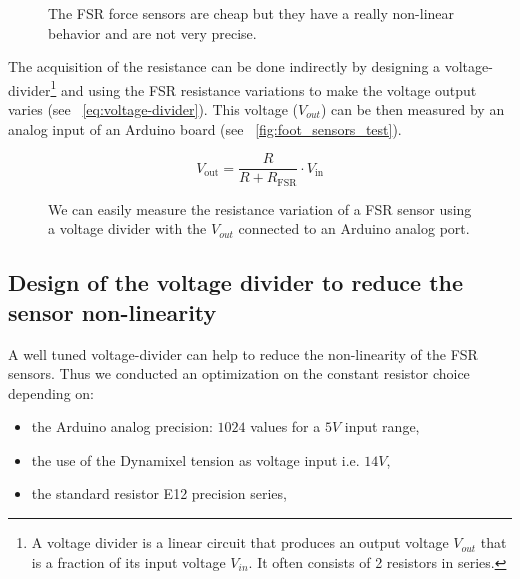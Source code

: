 \begin{figure}[h]
\centering
    \hfil
    \caption{The FSR force sensors are cheap but they have a really non-linear behavior and are not very precise.}
    \label{fig:}
\end{figure}

The acquisition of the resistance can be done indirectly by designing a voltage-divider\footnote{A voltage divider is a linear circuit that produces an output voltage $V_{out}$ that is a fraction of its input voltage $V_{in}$. It often consists of 2 resistors in series.} and using the FSR resistance variations to make the voltage output varies (see \equationname~\ref{eq:voltage-divider}). This voltage ($V_{out}$) can be then measured by an analog input of an Arduino board (see \figurename~\ref{fig:foot_sensors_test}).

\begin{equation}
    V_\mathrm{out} = \frac{R}{R+R_\mathrm{FSR}} \cdot V_\mathrm{in}
\label{eq:voltage-divider}
\end{equation}


\begin{figure}[!h]
\centering
    \hfil
    \caption{We can easily measure the resistance variation of a FSR sensor using a voltage divider with the $V_{out}$ connected to an Arduino analog port.}
    \label{fig:test_sensors}
\end{figure}

\subsection{Design of the voltage divider to reduce the sensor non-linearity} %

A well tuned voltage-divider can help to reduce the non-linearity of the FSR sensors. Thus we conducted an optimization on the constant resistor choice depending on:
\begin{itemize}
    \item the Arduino analog precision: $1024$ values for a $5V$ input range,
    \item the use of the Dynamixel tension as voltage input i.e. $14V$,
    \item the standard resistor E12 precision series,
\end{itemize}

